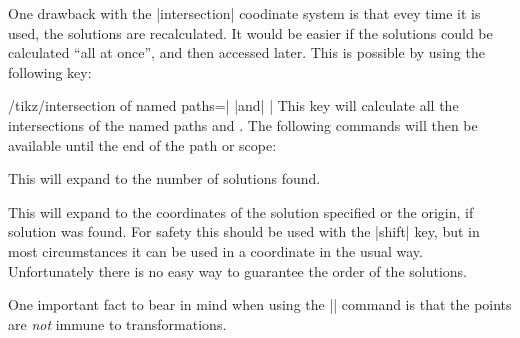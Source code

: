   One drawback with the |intersection| coodinate system is that
  evey time it is used, the solutions are recalculated. It would be
  easier if the solutions could be calculated ``all at once'', and
  then accessed later. This is possible by using the following key:
  
\begin{key}{/tikz/intersection of named paths=| |and| |}
  This key will calculate all the intersections of the named paths
   and . The following commands will then
  be available until the end of the path or scope:

\begin{command}{\solutions}
  This will expand to the number of solutions found.
\end{command}

\begin{command}{\solution{}}
  This will expand to the coordinates of the solution specified or the 
  origin, if solution  was found. For safety this should
  be used with the |shift| key, but in most circumstances it can be
  used in a coordinate in the usual way.
  Unfortunately there is no easy way to guarantee the order of the
  solutions.
\end{command}

  

\begin{codeexample}[]
\end{codeexample}

   One important fact to bear in mind when using the |\solution|
   command is that the points are \emph{not} immune to transformations.

\begin{codeexample}[]
%
\end{codeexample}
   
\end{key}



